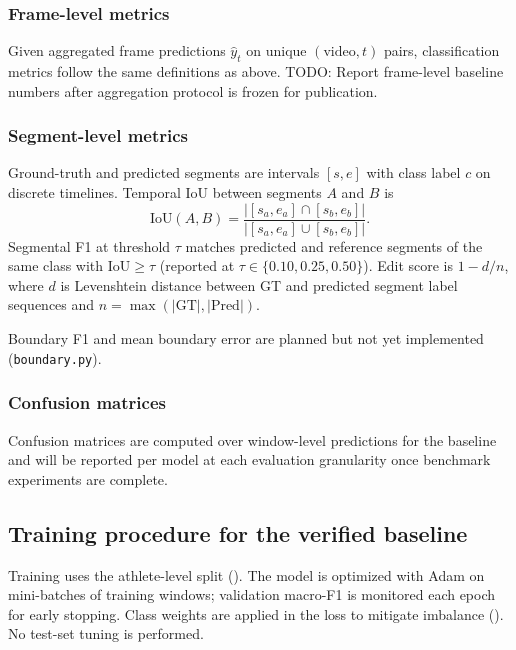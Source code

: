 \subsubsection{Frame-level metrics}
\label{sec:protocol:metrics:frame}

Given aggregated frame predictions $\hat{y}_t$ on unique $(\text{video}, t)$ pairs, classification metrics follow the same definitions as above.
\textsc{TODO:} Report frame-level baseline numbers after aggregation protocol is frozen for publication.

\subsubsection{Segment-level metrics}
\label{sec:protocol:metrics:segment}

Ground-truth and predicted segments are intervals $[s,e]$ with class label $c$ on discrete timelines.
Temporal IoU between segments $A$ and $B$ is
\begin{equation}
  \mathrm{IoU}(A,B) = \frac{|[s_a,e_a] \cap [s_b,e_b]|}{|[s_a,e_a] \cup [s_b,e_b]|}.
\end{equation}
Segmental F1 at threshold $\tau$ matches predicted and reference segments of the same class with $\mathrm{IoU}\ge\tau$ (reported at $\tau \in \{0.10, 0.25, 0.50\}$).
Edit score is $1 - d/n$, where $d$ is Levenshtein distance between GT and predicted segment label sequences and $n = \max(|\text{GT}|, |\text{Pred}|)$.

Boundary F1 and mean boundary error are planned but not yet implemented (\texttt{boundary.py}).

\subsubsection{Confusion matrices}
\label{sec:protocol:confusion}

Confusion matrices are computed over window-level predictions for the baseline and will be reported per model at each evaluation granularity once benchmark experiments are complete.

\subsection{Training procedure for the verified baseline}
\label{sec:protocol:training}

Training uses the athlete-level split ().
The model is optimized with Adam on mini-batches of training windows; validation macro-F1 is monitored each epoch for early stopping.
Class weights are applied in the loss to mitigate imbalance ().
No test-set tuning is performed.

